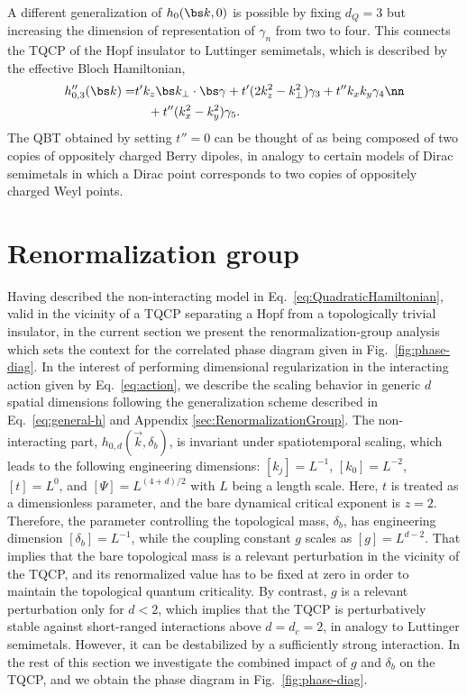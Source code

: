 \documentclass[reprint,floatfix, twocolumn]{revtex4-1}
\begin{document}
A different generalization of
$h_0(\bs k,0)$ is possible by fixing $d_Q = 3$ but increasing the dimension of representation of $\gamma_n$ from two to four. 
This connects the TQCP of the Hopf insulator to Luttinger semimetals, which is described by the effective  Bloch Hamiltonian, 
\begin{align}
h''_{0,3}(\bs k) =& t' k_z \bs k_\perp \cdot \bs \gamma + t'(2k_z^2 - k_\perp^2) \gamma_{3} + t'' k_x k_y \gamma_4 \nn \\ 
& \quad + t''(k_x^2 - k_y^2) \gamma_5.
\end{align}
The QBT obtained by setting $t'' = 0$ can be thought of as being composed of two copies of oppositely charged Berry dipoles, in analogy to certain models of Dirac semimetals in which a Dirac point corresponds to two copies of oppositely charged Weyl points.

\section{Renormalization group}\label{sec:RG}
Having described the non-interacting model in Eq.~\eqref{eq:QuadraticHamiltonian}, valid in the vicinity of a TQCP separating a Hopf from a topologically trivial insulator, in the current section we present the renormalization-group analysis which sets the context for the correlated phase diagram given in Fig.~\ref{fig:phase-diag}.
{In the interest of performing dimensional regularization in the interacting action given by Eq.~\eqref{eq:action}, we describe the scaling behavior in generic $d$ spatial dimensions following the generalization scheme described in Eq.~\eqref{eq:general-h} and Appendix \ref{sec:RenormalizationGroup}.}
The non-interacting part, $h_{0,d}(\vec{k},\delta_b)$, is invariant under spatiotemporal scaling, which leads to the following engineering dimensions: $[k_j] = L^{-1}$, $[k_0] = L^{-2}$, $[t] = L^0$, and $[\Psi] = L^{(4 + d)/2}$ with $L$ being a length scale.
Here, $t$ is treated as a dimensionless parameter, and the bare dynamical critical exponent is $z = 2$.
Therefore, the parameter controlling the topological mass, $\delta_b$, has engineering dimension $[\delta_b]=L^{-1}$, {while the coupling constant} $g$ scales as $[g] = L^{d-2}$.
That implies that the bare topological mass is a relevant perturbation in the vicinity of the TQCP, and its renormalized value has to be fixed at zero in order to maintain the topological quantum criticality.
By contrast, $g$ is a relevant perturbation only for $d < 2$, which implies that the TQCP is perturbatively stable against short-ranged interactions above $d = d_c =2$, in analogy to Luttinger semimetals. 
{However}, it can be destabilized by a sufficiently strong interaction.
In the rest of this section we investigate the combined impact of $g$  and $\delta_b$ on the TQCP, and {we} obtain the phase diagram in Fig.~\ref{fig:phase-diag}.
\end{document}
